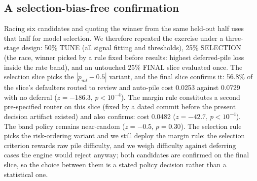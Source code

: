 \documentclass[conference]{IEEEtran}
\begin{document}
\subsection{A selection-bias-free confirmation}\label{sec:finaltest}
Racing six candidates and quoting the winner from the same held-out half
uses that half for model selection. We therefore repeated the exercise
under a three-stage design: 50\% TUNE (all signal fitting and thresholds),
25\% SELECTION (the race, winner picked by a rule fixed before results:
highest deferred-pile loss inside the rate band), and an untouched 25\%
FINAL slice evaluated once. The selection slice picks the $|p_{ml}{-}0.5|$
variant, and the final slice confirms it: 56.8\% of the slice's defaulters
routed to review and auto-pile cost 0.0253 against 0.0729 with no deferral
($z = -186.3$, $p < 10^{-4}$). The margin rule constitutes a second
pre-specified router on this slice (fixed by a dated commit before the
present decision artifact existed) and also confirms: cost 0.0482
($z = -42.7$, $p < 10^{-4}$). The band policy remains near-random
($z = -0.5$, $p = 0.30$). The selection rule picks the risk-ordering
variant and we still deploy the margin rule: the selection criterion
rewards raw pile difficulty, and we weigh difficulty against deferring
cases the engine would reject anyway; both candidates are confirmed on the
final slice, so the choice between them is a stated policy decision rather
than a statistical one.
\end{document}
